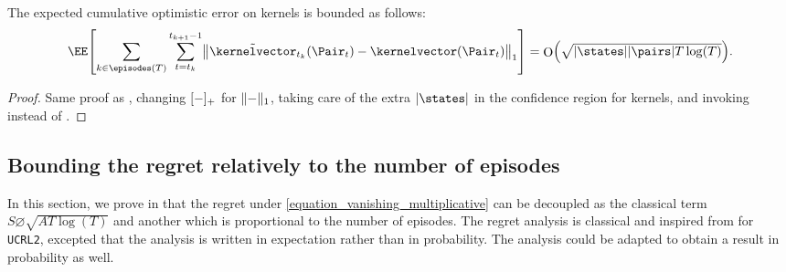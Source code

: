 \documentclass[preprint,cleveref,12pt]{colt2025}
\DeclarePairedDelimiter{\brackets}{[}{]}	%
\DeclarePairedDelimiter{\parens}{(}{)}	%
\DeclarePairedDelimiter{\abs}{\lvert}{\rvert}	%
\DeclarePairedDelimiter{\pospart}{[}{]_{+}}	%
\DeclarePairedDelimiter{\norm}{\lVert}{\rVert}	%
\newcommand{\tsqrt}[1]{{\textstyle\sqrt{#1}}} %
\DeclareMathOperator*{\OH}{\mathrm{O}}
\def\kernel{\kernelvector}
\begin{document}
    \begin{lemma}
    \label{lemma_expected_kernel_error}
        The expected cumulative optimistic error on kernels is bounded as follows:
        \begin{equation*}
            \EE \brackets*{
                \sum_{k \in \episodes(T)}
                \sum_{t = t_k}^{t_{k+1}-1}
                \norm*{
                    \tilde{\kernel}_{t_k}(\Pair_t) - \kernel(\Pair_t)
                }_1
            }
            =
            \OH \parens*{
                \tsqrt{\abs{\states} \abs{\pairs} T \log(T)}
            }
            .
        \end{equation*}
    \end{lemma}
    \begin{proof}
        Same proof as , changing $\pospart{-}$ for $\norm{-}_1$, taking care of the extra $\abs{\states}$ in the confidence region for kernels, and invoking  instead of .
    \end{proof}

    \subsection{Bounding the regret relatively to the number of episodes}
    \label{appendix_regret_episodes}

    In this section, we prove in  that the regret under \eqref{equation_vanishing_multiplicative} can be decoupled as the classical term $S \diameter \sqrt{A T \log(T)}$ and another which is proportional to the number of episodes. 
    The regret analysis is classical and inspired from \cite{auer_near_optimal_2009} for \texttt{UCRL2}, excepted that the analysis is written in expectation rather than in probability. 
    The analysis could be adapted to obtain a result in probability as well. 
\end{document}
